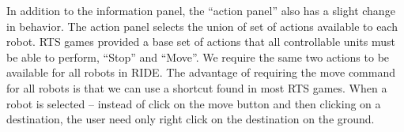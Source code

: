 In addition to the information panel, the ``action panel'' also has a slight change in behavior. The action panel selects the union of set of actions available to each robot. RTS games provided a base set of actions that all controllable units must be able to perform, ``Stop'' and ``Move''. We require the same two actions to be available for all robots in RIDE. The advantage of requiring the move command for all robots is that we can use a shortcut found in most RTS games. When a robot is selected -- instead of click on the move button and then clicking on a destination, the user need only right click on the destination on the ground.


% 
% 
% 
% 
